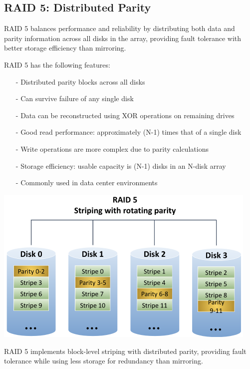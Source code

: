 \documentclass[../../compsys.tex]{subfiles}
\begin{document}
\subsection{RAID 5: Distributed Parity}
RAID 5 balances performance and reliability by distributing both data and parity information across all disks in the array, providing fault tolerance with better storage efficiency than mirroring.\\[5px]
\begin{minipage}{0.45\textwidth}
    \small
    RAID 5 has the following features:
    \begin{itemize}
        \item[-] Distributed parity blocks across all disks
        \item[-] Can survive failure of any single disk
        \item[-] Data can be reconstructed using XOR operations on remaining drives
        \item[-] Good read performance: approximately (N-1) times that of a single disk
        \item[-] Write operations are more complex due to parity calculations
        \item[-] Storage efficiency: usable capacity is (N-1) disks in an N-disk array
        \item[-] Commonly used in data center environments
    \end{itemize}
\end{minipage}
\hfill
\vline
\hfill
\begin{minipage}{0.45\textwidth}
    \begin{center}
        \includegraphics[width=0.95\textwidth]{chapters/L8/images/raid5.png}
    \end{center}
\end{minipage}
\vspace{10px}
\begin{definition}[RAID 5]
RAID 5 implements block-level striping with distributed parity, providing fault tolerance while using less storage for redundancy than mirroring.
\end{definition}
\end{document}
